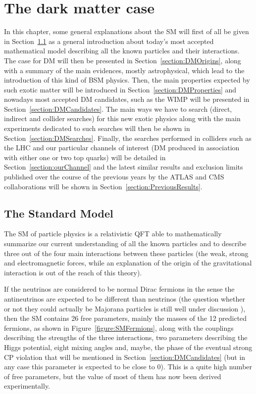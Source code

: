 \documentclass[a4paper, 10pt, openright]{report}
\begin{document}
\chapter{The dark matter case}\label{chapter:Case}

In this chapter, some general explanations about the \ac{SM} will first of all be given in Section~\ref{section:SM} as a general introduction about today's most accepted mathematical model describing all the known particles and their interactions. The case for \ac{DM} will then be presented in Section~\ref{section:DMOrigins}, along with a summary of the main evidences, mostly astrophysical, which lead to the introduction of this kind of \acf{BSM} physics. Then, the main properties expected by such exotic matter will be introduced in Section~\ref{section:DMProperties} and nowadays most accepted \ac{DM} candidates, such as the \acf{WIMP} will be presented in Section~\ref{section:DMCandidates}. The main ways we have to search (direct, indirect and collider searches) for this new exotic physics along with the main experiments dedicated to such searches will then be shown in Section~\ref{section:DMSearches}. Finally, the searches performed in colliders such as the \ac{LHC} and our particular channels of interest (\ac{DM} produced in association with either one or two top quarks) will be detailed in Section~\ref{section:ourChannel} and the latest similar results and exclusion limits published over the course of the previous years by the \ac{ATLAS} and \ac{CMS} collaborations will be shown in Section~\ref{section:PreviousResults}.

\section{The Standard Model} \label{section:SM}

The \ac{SM} of particle physics is a relativistic \ac{QFT} able to  mathematically summarize our current understanding of all the known particles and to describe three out of the four main interactions between these particles (the weak, strong and electromagnetic forces, while an explanation of the origin of the gravitational interaction is out of the reach of this theory). 

If the neutrinos are considered to be normal Dirac fermions in the sense the antineutrinos are expected to be different than neutrinos (the question whether or not they could actually be Majorana particles is still well under discussion \cite{Majorana}), then the \ac{SM} contains 26 free parameters, mainly the masses of the 12 predicted fermions, as shown in Figure~\ref{figure:SMFermions}, along with the couplings describing the strengths of the three interactions, two parameters describing the Higgs potential, eight mixing angles and, maybe, the phase of the eventual strong CP violation that will be mentioned in Section~\ref{section:DMCandidates} (but in any case this parameter is expected to be close to 0). This is a quite high number of free parameters, but the value of most of them has now been derived experimentally.
\end{document}
